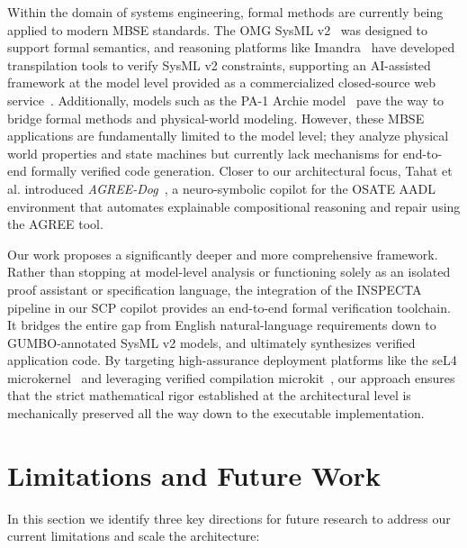 \documentclass[conference]{IEEEtran}
\newcommand{\todo}[1]{\textcolor{red}{\textbf{TODO}: {#1}}}
\begin{document}
Within the domain of systems engineering, formal methods are currently being applied to modern MBSE standards. The OMG SysML v2~\cite{sysmlv2} was designed to support formal semantics, and reasoning platforms like Imandra~\cite{imandra_sysml} have developed transpilation tools to verify SysML v2 constraints, supporting an AI-assisted framework at the model level provided as a commercialized closed-source web service~\cite{imandra_sysml}. Additionally, models such as the PA-1 Archie model~\cite{neema2025evaluationengineeringartificialgeneral} pave the way to bridge formal methods and physical-world modeling. However, these MBSE applications are fundamentally limited to the model level; they analyze physical world properties and state machines but currently lack mechanisms for end-to-end formally verified code generation. Closer to our architectural focus, Tahat et al. introduced \textit{AGREE-Dog}~\cite{agreedog_tahat2025}, a neuro-symbolic copilot for the OSATE AADL~\cite{feiler-aadl} environment that automates explainable compositional reasoning and repair using the AGREE tool.

Our work proposes a significantly deeper and more comprehensive framework. Rather than stopping at model-level analysis or functioning solely as an isolated proof assistant or specification language, the integration of the INSPECTA pipeline in our SCP copilot provides an end-to-end formal verification toolchain. It bridges the entire gap from English natural-language requirements down to GUMBO-annotated SysML v2 models, and ultimately synthesizes verified application code. By targeting high-assurance deployment platforms like the seL4 microkernel~\cite{sel4_klein2009} and leveraging verified compilation microkit~\cite{sel4-microkit}, our approach ensures that the strict mathematical rigor established at the architectural level is mechanically preserved all the way down to the executable implementation.

\section{Limitations and Future Work}
\label{sec:limitations}

In this section we identify three key directions for future research to address our current limitations and scale the architecture:
\end{document}
